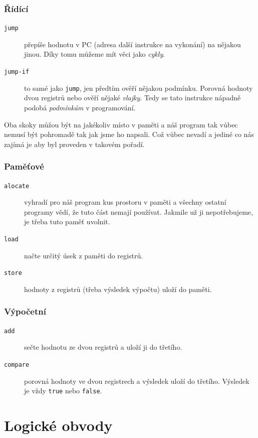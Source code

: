 \documentclass{beamer}
\begin{document}
\begin{frame}
	\frametitle{Řídící}
	\begin{description}
		\item[\texttt{jump}] přepíše hodnotu v PC (adresa další instrukce na vykonání)
		      na nějakou jinou. Díky tomu můžeme mít věci jako \emph{cykly}.
		\item[\texttt{jump-if}] to samé jako \texttt{jump}, jen předtím ověří nějakou
		      podmínku. Porovná hodnoty dvou registrů nebo ověří nějaké
		      \emph{vlajky}. Tedy se tato instrukce nápadně podobá \emph{podmínkám}
		      v programování.
	\end{description}
	
	Oba skoky můžou být na jakékoliv místo v paměti a náš program tak vůbec nemusí být
	pohromadě tak jak jsme ho napsali. Což vůbec nevadí a jediné co nás zajímá je
	aby byl proveden v takovém pořadí.
\end{frame}


\begin{frame}
	\frametitle{Paměťové}
	\begin{description}
		\item[\texttt{alocate}] vyhradí pro náš program kus prostoru v paměti a
		      všechny ostatní programy vědí, že tuto část nemají používat. Jakmile už ji
		      nepotřebujeme, je třeba tuto paměť uvolnit.
		\item[\texttt{load}] načte určitý úsek z paměti do registrů.

		\item [\texttt{store}] hodnoty z registrů (třeba výsledek výpočtu)
		      uloží do paměti.
	\end{description}
\end{frame}

\begin{frame}
	\frametitle{Výpočetní}
	\begin{description}
		\item[\texttt{add}] sečte hodnotu ze dvou registrů a uloží ji do třetího.
		\item[\texttt{compare}] porovná hodnoty ve dvou registrech a výsledek uloží do
		      třetího. Výsledek je vždy \texttt{true} nebo \texttt{false}.
	\end{description}
\end{frame}

\section{Logické obvody}
\label{sec:logicke-obvody}
\end{document}
